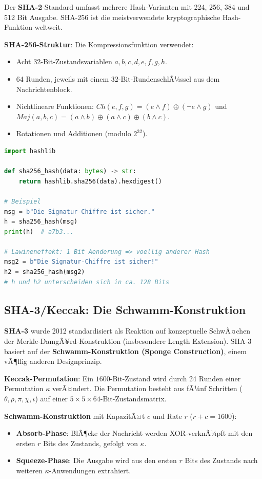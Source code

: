 ﻿\documentclass[a4paper,12pt]{scrreprt}
\theoremstyle{definition}
\begin{document}
Der \textbf{SHA-2}-Standard \cite{NIST15a} umfasst mehrere Hash-Varianten mit 224, 256, 384 und 512 Bit Ausgabe. SHA-256 ist die meistverwendete kryptographische Hash-Funktion weltweit.

\textbf{SHA-256-Struktur}: Die Kompressionsfunktion verwendet:
\begin{itemize}
    \item Acht 32-Bit-Zustandsvariablen $a, b, c, d, e, f, g, h$.
    \item 64 Runden, jeweils mit einem 32-Bit-RundenschlÃ¼ssel aus dem Nachrichtenblock.
    \item Nichtlineare Funktionen: $Ch(e,f,g) = (e \wedge f) \oplus (\neg e \wedge g)$ und $Maj(a,b,c) = (a \wedge b) \oplus (a \wedge c) \oplus (b \wedge c)$.
    \item Rotationen und Additionen (modulo $2^{32}$).
\end{itemize}

\begin{lstlisting}[language=Python, caption=SHA-256 Anwendung]
import hashlib

def sha256_hash(data: bytes) -> str:
    return hashlib.sha256(data).hexdigest()

# Beispiel
msg = b"Die Signatur-Chiffre ist sicher."
h = sha256_hash(msg)
print(h)  # a7b3...

# Lawineneffekt: 1 Bit Aenderung => voellig anderer Hash
msg2 = b"Die Signatur-Chiffre ist sicher!"
h2 = sha256_hash(msg2)
# h und h2 unterscheiden sich in ca. 128 Bits
\end{lstlisting}

\subsection{SHA-3/Keccak: Die Schwamm-Konstruktion}

\textbf{SHA-3} \cite{BDPA13} wurde 2012 standardisiert als Reaktion auf konzeptuelle SchwÃ¤chen der Merkle-DamgÃ¥rd-Konstruktion (insbesondere Length Extension). SHA-3 basiert auf der \textbf{Schwamm-Konstruktion (Sponge Construction)}, einem vÃ¶llig anderen Designprinzip.

\textbf{Keccak-Permutation}: Ein $1600$-Bit-Zustand wird durch 24 Runden einer Permutation $\kappa$ verÃ¤ndert. Die Permutation besteht aus fÃ¼nf Schritten ($\theta, \rho, \pi, \chi, \iota$) auf einer $5 \times 5 \times 64$-Bit-Zustandsmatrix.

\textbf{Schwamm-Konstruktion} mit KapazitÃ¤t $c$ und Rate $r$ ($r + c = 1600$):
\begin{itemize}
    \item \textbf{Absorb-Phase}: BlÃ¶cke der Nachricht werden XOR-verknÃ¼pft mit den ersten $r$ Bits des Zustands, gefolgt von $\kappa$.
    \item \textbf{Squeeze-Phase}: Die Ausgabe wird aus den ersten $r$ Bits des Zustands nach weiteren $\kappa$-Anwendungen extrahiert.
\end{itemize}
\end{document}
